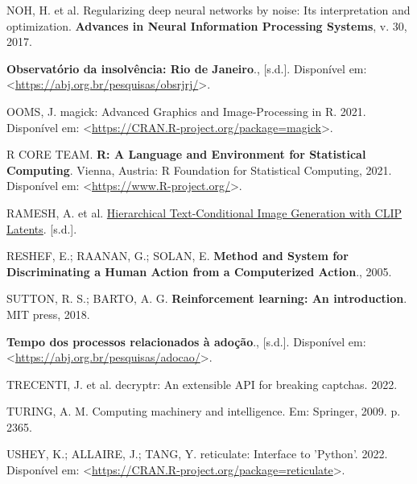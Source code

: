 \documentclass[12pt,twoside,brazilian]{book}
\newlength{\cslhangindent}
\newlength{\cslentryspacingunit} %
\newenvironment{CSLReferences}[2] %
 {%
  \setlength{\parindent}{0pt}
  \ifodd #1
  \let\oldpar\par
  \def\par{\hangindent=\cslhangindent\oldpar}
  \fi
  \setlength{\parskip}{#2\cslentryspacingunit}
 }%
 {}
\begin{document}
\begin{CSLReferences}{0}{1}
\leavevmode{}%
NOH, H. et al. Regularizing deep neural networks by noise: Its
interpretation and optimization. \textbf{Advances in Neural Information
Processing Systems}, v. 30, 2017.

\leavevmode{}%
\textbf{Observatório da insolvência: Rio de Janeiro}., {[}s.d.{]}.
Disponível em:
\textless{}\url{https://abj.org.br/pesquisas/obsrjrj/}\textgreater.

\leavevmode{}%
OOMS, J. magick: Advanced Graphics and Image-Processing in R. 2021.
Disponível em:
\textless{}\url{https://CRAN.R-project.org/package=magick}\textgreater.

\leavevmode{}%
R CORE TEAM. \textbf{R: A Language and Environment for Statistical
Computing}. Vienna, Austria: R Foundation for Statistical Computing,
2021. Disponível em:
\textless{}\url{https://www.R-project.org/}\textgreater.

\leavevmode{}%
RAMESH, A. et al.
\href{https://doi.org/10.48550/arXiv.2204.06125}{Hierarchical
Text-Conditional Image Generation with CLIP Latents}. {[}s.d.{]}.

\leavevmode{}%
RESHEF, E.; RAANAN, G.; SOLAN, E. \textbf{Method and System for
Discriminating a Human Action from a Computerized Action}., 2005.

\leavevmode{}%
SUTTON, R. S.; BARTO, A. G. \textbf{Reinforcement learning: An
introduction}. MIT press, 2018.

\leavevmode{}%
\textbf{Tempo dos processos relacionados à adoção}., {[}s.d.{]}.
Disponível em:
\textless{}\url{https://abj.org.br/pesquisas/adocao/}\textgreater.

\leavevmode{}%
TRECENTI, J. et al. decryptr: An extensible API for breaking captchas.
2022.

\leavevmode{}%
TURING, A. M. Computing machinery and intelligence. Em: Springer, 2009.
p. 2365.

\leavevmode{}%
USHEY, K.; ALLAIRE, J.; TANG, Y. reticulate: Interface to 'Python'.
2022. Disponível em:
\textless{}\url{https://CRAN.R-project.org/package=reticulate}\textgreater.


\end{CSLReferences}
\end{document}
